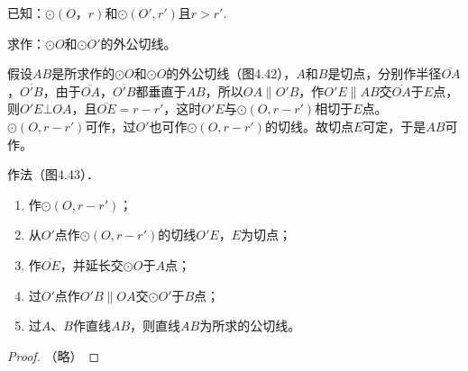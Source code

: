 已知：$\odot(O，r)$和$\odot (O',r')$且$r>r'$.

求作：$\odot O$和$\odot O'$的外公切线。

\begin{figure}[htp]
  \centering
{}
  \caption{}
\end{figure}


\begin{analyze}
  假设$AB$是所求作的$\odot O$和$\odot O$的外公切线（图4.42），$A$和$B$是切点，分别作半径$\overline{OA}$，$\overline{O'B}$，由于$\overline{OA}$，$\overline{O'B}$都垂直于$AB$，所以$OA\parallel O'B$，作$O'E\parallel AB$交$\overline{OA}$于$E$点，则$O'E\bot OA$，且$\overline{OE}=r-r'$，这时$O'E$与$\odot (O,r-r')$相切于$E$点。$\odot (O,r-r')$可作，过$O'$也可作$\odot (O,r-r')$的切线。故切点$E$可定，于是$AB$可作。
\end{analyze}

作法（图4.43）．
\begin{enumerate}
\item 作$\odot (O,r-r')$；
\item 从$O'$点作$\odot (O,r-r')$的切线$O'E$，$E$为切点；
\item 作$\overline{OE}$，并延长交$\odot O$于$A$点；
\item 过$O'$点作$O'B\parallel OA$交$\odot O'$于$B$点；
\item 过$A$、$B$作直线$AB$，则直线$AB$为所求的公切线。
\end{enumerate}

\begin{proof}
  （略）
\end{proof}

